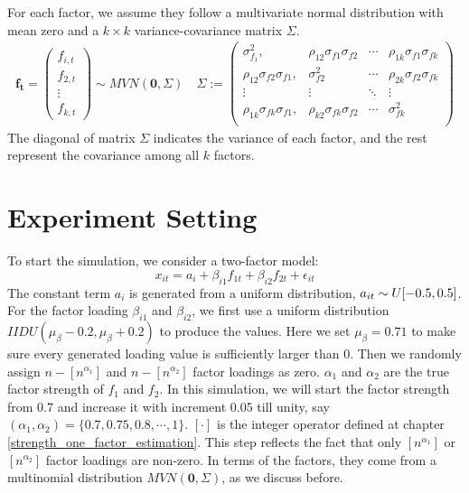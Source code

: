  For each factor, we assume they follow a multivariate normal distribution with mean zero and a $k\times k$ variance-covariance matrix $\Sigma$. 
\begin{align*}
\bm{f_t} = \begin{pmatrix}
f_{i,t}\\f_{2,t}\\\vdots\\f_{k,t}
\end{pmatrix} \sim MVN(\bm{0}, \Sigma) \quad
 \Sigma := 
\begin{pmatrix}
\sigma^2_{f_1}, & \rho_{12}\sigma_{f1}\sigma_{f2} &\cdots  & \rho_{1k}\sigma_{f1}\sigma_{fk}\\
\rho_{12}\sigma_{f2}\sigma_{f1}, & \sigma^2_{f2} &\cdots  & \rho_{2k}\sigma_{f2}\sigma_{fk}\\
\vdots & \vdots & \ddots & \vdots \\
\rho_{1k}\sigma_{fk}\sigma_{f1}, & \rho_{k2}\sigma_{fk}\sigma_{f2} &\cdots  & \sigma^2_{fk}\\
\end{pmatrix}
\end{align*}
The diagonal of matrix $\Sigma$ indicates the variance of each factor, and the rest represent the covariance among all $k$ factors.


	\section{Experiment Setting}\label{exp_set}
To start the simulation, we consider a two-factor model:
\[    x_{it} = a_{i} + \beta_{i1}f_{1t} + \beta_{i2}f_{2t}+\epsilon_{it} \tag{8} \label{two_factor}   \]
The constant term $a_{i}$ is generated from a uniform distribution, $a_{it} \sim \mathnormal{U}[-0.5,0.5]$.
For the factor loading $\beta_{i1}$ and $\beta_{i2}$, we first use a uniform distribution $IIDU(\mu_{\beta} - 0.2, \mu_{\beta}+0.2)$ to produce the values.
Here we set $\mu_{\beta}=0.71$ to make sure every generated loading value is sufficiently larger than 0.
Then we randomly assign $n - [n^{\alpha_{1}}]$ and $n - [n^{\alpha_{2}}]$ factor loadings as zero.
$\alpha_1$ and $\alpha_2$ are the true factor strength of $f_1$ and $f_2$. 
In this simulation, we will start the factor strength from 0.7 and increase it with increment 0.05 till unity, say $(\alpha_{1}, \alpha_{2}) = \{0.7, 0.75,0.8,\cdots,1\}$.
 $[\cdot]$ is the integer operator defined at chapter \ref{strength_one_factor_estimation}.
This step reflects the fact that only $[n^{\alpha_1}]$ or $[n^{\alpha_2}]$ factor loadings are non-zero.
In terms of the factors, they come from a multinomial distribution $MVN(\bm{0}, \Sigma) $, as we discuss before.

